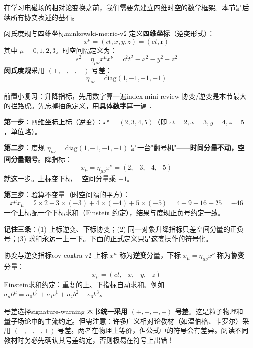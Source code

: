 \documentclass[11pt,a4paper,openany,oneside]{book}
\newcommand{\vect}[1]{\bm{#1}}
\begin{document}
在学习电磁场的相对论变换之前，我们需要先建立四维时空的数学框架。本节是后续所有协变表述的基石。

\begin{definition}{闵氏度规与四维坐标}{minkowski-metric-v2}
定义\textbf{四维坐标}（逆变形式）：
\[
x^\mu = (ct, x, y, z) = (ct, \vect{r})
\]
其中 $\mu = 0, 1, 2, 3$。时空间隔定义为：
\[
s^2 = \eta_{\mu\nu} x^\mu x^\nu = c^2t^2 - x^2 - y^2 - z^2
\]
\textbf{闵氏度规}采用 $(+,-,-,-)$ 号差：
\[
\eta_{\mu\nu} = \mathrm{diag}(1, -1, -1, -1)
\]
\end{definition}

\begin{tip}{前置小复习：升降指标，先用数字算一遍}{index-mini-review}
协变/逆变是本节最大的拦路虎。先忘掉抽象定义，用\textbf{具体数字}算一遍：

\textbf{第一步}：四维坐标上标（逆变）：$x^\mu = (2, 3, 4, 5)$（即 $ct=2, x=3, y=4, z=5$，单位略）。

\textbf{第二步}：度规 $\eta_{\mu\nu} = \mathrm{diag}(1,-1,-1,-1)$ 是一台"翻号机"——\textbf{时间分量不动，空间分量翻号}。降指标：
\[
x_\mu = \eta_{\mu\nu}x^\nu = (2, -3, -4, -5)
\]
就这一步。上标变下标 = 空间分量乘 $-1$。

\textbf{第三步}：验算不变量（时空间隔的平方）：
\[
x^\mu x_\mu = 2\times 2 + 3\times(-3) + 4\times(-4) + 5\times(-5) = 4 - 9 - 16 - 25 = -46
\]
一个上标配一个下标求和（Einstein 约定），结果与度规正负号约定一致。

\textbf{记住三条}：(1) 上标逆变、下标协变；(2) 同一对象升降指标只差空间分量的正负号；(3) 求和永远一上一下。下面的正式定义只是这套操作的符号化。
\end{tip}

\begin{insight}{协变与逆变指标}{cov-contra-v2}
上标 $x^\mu$ 称为\textbf{逆变}分量，下标 $x_\mu = \eta_{\mu\nu} x^\nu$ 称为\textbf{协变}分量：
\[
x_\mu = (ct, -x, -y, -z)
\]
 Einstein求和约定：重复的上、下指标自动求和。例如 $a_\mu b^\mu = a_0 b^0 + a_1 b^1 + a_2 b^2 + a_3 b^3$。
\end{insight}

\begin{warning}{号差选择}{signature-warning}
本书\textbf{统一采用 $(+,-,-,-)$ 号差}。这是粒子物理和量子场论中的主流约定。但需注意：许多广义相对论教材（如温伯格、卡罗尔）采用 $(-,+,+,+)$ 号差。两者在物理上等价，但公式中的符号会有差异。阅读不同教材时务必先确认其号差约定，否则极易在符号上出错！
\end{warning}
\end{document}
